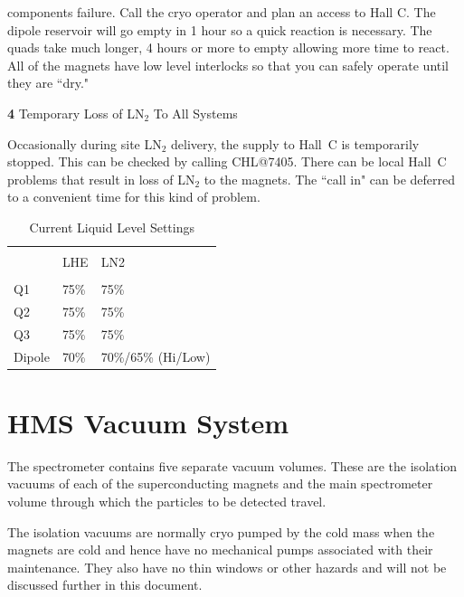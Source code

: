 {\begin{description}
components failure.  Call the cryo operator and plan an access to Hall
C. The dipole reservoir will go empty in 1 hour so a quick reaction is
necessary.  The quads take much longer, 4 hours or more to empty
allowing more time to react.  All of the magnets have low level
interlocks so that you can safely operate until they are ``dry."
\item{\bf 4}\hskip0.1in Temporary Loss of LN$_2$ To All Systems
\item{}\hskip0.3in Occasionally during site LN$_2$ delivery, the supply to
Hall~C
is temporarily stopped.  This can be checked by calling CHL@7405.  There
can be local Hall~C problems that result in loss of LN$_2$ to the
magnets. The ``call in" can be deferred to a convenient time for this
kind of problem.
\end{description}

\begin{table}
\begin{center}
\caption{Current Liquid Level Settings\label{tab:liq_levels}}
\vspace{\baselineskip}
\begin{tabular}{|l|l|l|}
\hline
{} & {}  & {}  \\
{} & LHE & LN2 \\
{} & {}  & {}  \\ \hline
Q1  & 75\% & 75\% \\
Q2  & 75\% & 75\% \\
Q3  & 75\% & 75\% \\
Dipole& 70\% & 70\%/65\% (Hi/Low) \\
\hline
\end{tabular}
\end{center}
\end{table}


\section{HMS Vacuum System}

	The spectrometer contains five separate vacuum volumes.
These are the isolation vacuums of each of the superconducting
magnets and the main spectrometer volume through which the particles
to be detected travel.

The isolation vacuums are normally cryo pumped by the cold mass when the
magnets are cold and hence have no mechanical pumps
associated with their maintenance. They also have no thin
windows or other hazards and will not be discussed further in this document.

}
